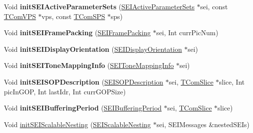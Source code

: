 \begin{DoxyCompactItemize}
\item 
\mbox{\label{class_s_e_i_encoder_a5bfb259c85f306582eb0acb11ca10ba3}} 
Void {\bfseries init\+S\+E\+I\+Active\+Parameter\+Sets} (\hyperlink{class_s_e_i_active_parameter_sets}{S\+E\+I\+Active\+Parameter\+Sets} $\ast$sei, const \hyperlink{class_t_com_v_p_s}{T\+Com\+V\+PS} $\ast$vps, const \hyperlink{class_t_com_s_p_s}{T\+Com\+S\+PS} $\ast$sps)
\item 
\mbox{\label{class_s_e_i_encoder_ac0037d71501247a312524fcd7423f0ec}} 
Void {\bfseries init\+S\+E\+I\+Frame\+Packing} (\hyperlink{class_s_e_i_frame_packing}{S\+E\+I\+Frame\+Packing} $\ast$sei, Int curr\+Pic\+Num)
\item 
\mbox{\label{class_s_e_i_encoder_aec39563154ef5d15e32bee61535e6a2c}} 
Void {\bfseries init\+S\+E\+I\+Display\+Orientation} (\hyperlink{class_s_e_i_display_orientation}{S\+E\+I\+Display\+Orientation} $\ast$sei)
\item 
\mbox{\label{class_s_e_i_encoder_a22a4dde35f23d228181e48bba5d3e3ca}} 
Void {\bfseries init\+S\+E\+I\+Tone\+Mapping\+Info} (\hyperlink{class_s_e_i_tone_mapping_info}{S\+E\+I\+Tone\+Mapping\+Info} $\ast$sei)
\item 
\mbox{\label{class_s_e_i_encoder_ab359e728c3566068cfdb24a8a51bb657}} 
Void {\bfseries init\+S\+E\+I\+S\+O\+P\+Description} (\hyperlink{class_s_e_i_s_o_p_description}{S\+E\+I\+S\+O\+P\+Description} $\ast$sei, \hyperlink{class_t_com_slice}{T\+Com\+Slice} $\ast$slice, Int pic\+In\+G\+OP, Int last\+Idr, Int curr\+G\+O\+P\+Size)
\item 
\mbox{\label{class_s_e_i_encoder_a24c5d92db8f71d0d6059f55a9acfe67c}} 
Void {\bfseries init\+S\+E\+I\+Buffering\+Period} (\hyperlink{class_s_e_i_buffering_period}{S\+E\+I\+Buffering\+Period} $\ast$sei, \hyperlink{class_t_com_slice}{T\+Com\+Slice} $\ast$slice)
\item 
Void \hyperlink{class_s_e_i_encoder_a1ea62701c0f010e2018c00a20d1357d1}{init\+S\+E\+I\+Scalable\+Nesting} (\hyperlink{class_s_e_i_scalable_nesting}{S\+E\+I\+Scalable\+Nesting} $\ast$sei, S\+E\+I\+Messages \&nested\+S\+E\+Is)
\item 

\end{DoxyCompactItemize}
